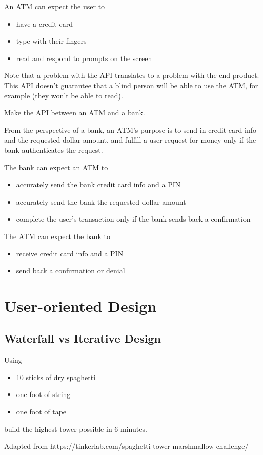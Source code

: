 An ATM can expect the user to
\begin{itemize}
	\item have a credit card
	\item type with their fingers
	\item read and respond to prompts on the screen
\end{itemize}

Note that a problem with the API translates to a problem with the end-product. This API doesn't guarantee that a blind person will be able to use the ATM, for example (they won't be able to read). 

\begin{example}
Make the API between an ATM and a bank.
\end{example}

From the perspective of a bank, an ATM's purpose is to send in credit card info and the requested dollar amount, and fulfill a user request for money only if the bank authenticates the request. 

The bank can expect an ATM to
\begin{itemize}
	\item accurately send the bank credit card info and a PIN
	\item accurately send the bank the requested dollar amount
	\item complete the user's transaction only if the bank sends back a confirmation
\end{itemize}

The ATM can expect the bank to
\begin{itemize}
	\item receive credit card info and a PIN
	\item send back a confirmation or denial 
\end{itemize}

\section{User-oriented Design}

\subsection{Waterfall vs Iterative Design}

\begin{example}
Using 
\begin{itemize}
	\item 10 sticks of dry spaghetti
	\item one foot of string
	\item one foot of tape
\end{itemize}

build the highest tower possible in 6 minutes.

Adapted from https://tinkerlab.com/spaghetti-tower-marshmallow-challenge/
\end{example}

